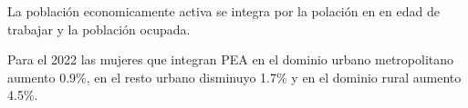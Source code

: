 La población economicamente activa se integra por la polación en en edad de trabajar y la población ocupada. 

Para el 2022 las mujeres que integran PEA en el dominio urbano metropolitano aumento 0.9\%, en el resto urbano disminuyo 1.7\% y en el dominio rural aumento 4.5\%.